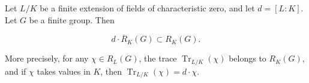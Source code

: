 Let $L/K$ be a finite extension of fields of characteristic zero, and let $d = [L : K]$. Let $G$ be a finite group. Then

$$d \cdot \overline{R}_K(G) \subset R_K(G).$$

More precisely, for any $\chi \in R_L(G)$, the trace $\operatorname{Tr}_{L/K}(\chi)$ belongs to $R_K(G)$, and if $\chi$ takes values in $K$, then $\operatorname{Tr}_{L/K}(\chi) = d \cdot \chi$.
